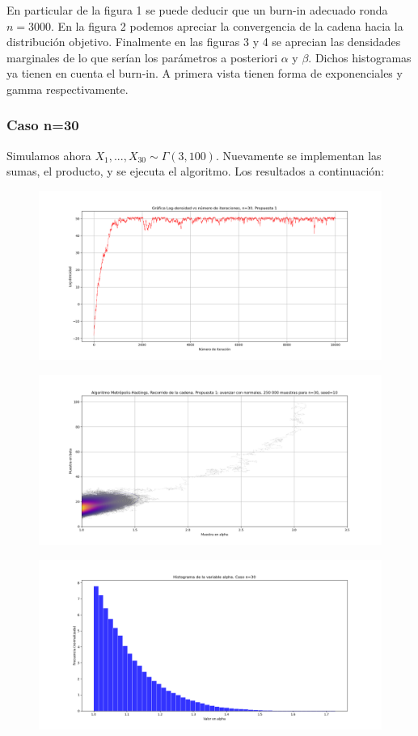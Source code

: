 \documentclass[letterpaper]{article}
\newcommand{\1}{\mathds{1}}
\theoremstyle{definition}
\theoremstyle{definition}
\theoremstyle{definition}
\theoremstyle{definition}
\theoremstyle{definition}
\begin{document}
En particular de la figura 1 se puede deducir que un burn-in adecuado ronda $n=3000$. En la figura 2 podemos 
apreciar la convergencia de la cadena hacia la distribución objetivo. Finalmente en las figuras 3 y 4 se aprecian 
las densidades marginales de lo que serían los parámetros a posteriori $\alpha$ y $\beta$. Dichos histogramas ya 
tienen en cuenta el burn-in. A primera vista 
tienen forma de exponenciales y gamma respectivamente.

\subsubsection*{Caso n=30}
Simulamos ahora $X_1,...,X_{30}\sim \Gamma(3,100)$. Nuevamente se implementan las sumas, el producto, y se ejecuta el algoritmo. Los resultados a continuación:
\begin{figure}[h!]
    \centering
    \includegraphics[width=\linewidth]{5.png}
    \caption{}
\end{figure} 
\begin{figure}[h!]
    \centering
    \includegraphics[width=\linewidth]{6.png}
    \caption{}
\end{figure} 
\begin{figure}[h!]
    \centering
    \includegraphics[width=\linewidth]{7.png}
    \caption{}
\end{figure} 
\end{document}
